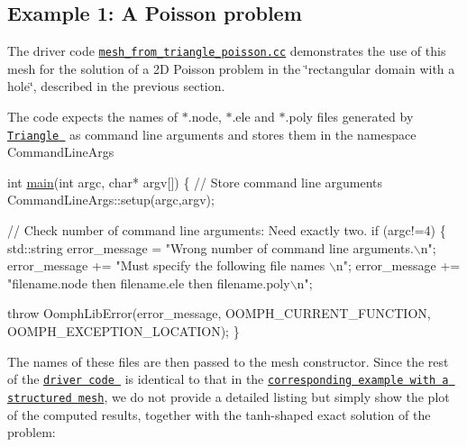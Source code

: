  

\hypertarget{index_poisson}{}\subsection{Example 1\+: A Poisson problem}\label{index_poisson}
The driver code \href{../../../../demo_drivers/meshing/mesh_from_triangle/mesh_from_triangle_poisson.cc}{\tt mesh\+\_\+from\+\_\+triangle\+\_\+poisson.\+cc} demonstrates the use of this mesh for the solution of a 2D Poisson problem in the \char`\"{}rectangular domain with a hole\char`\"{}, described in the previous section.

The code expects the names of {\ttfamily $\ast$}.{\ttfamily node}, $\ast$.{\ttfamily ele} and $\ast$.{\ttfamily poly} files generated by \href{http://www.cs.cmu.edu/~quake/triangle.html}{\tt {\ttfamily Triangle} } as command line arguments and stores them in the namespace {\ttfamily Command\+Line\+Args} 

 
\begin{DoxyCodeInclude}
\textcolor{keywordtype}{int} \hyperlink{mesh__from__triangle__navier__stokes_8cc_a0ddf1224851353fc92bfbff6f499fa97}{main}(\textcolor{keywordtype}{int} argc, \textcolor{keywordtype}{char}* argv[])
\{
 \textcolor{comment}{// Store command line arguments}
 CommandLineArgs::setup(argc,argv);

 \textcolor{comment}{// Check number of command line arguments: Need exactly two.}
 \textcolor{keywordflow}{if} (argc!=4)
  \{
   std::string error\_message =
    \textcolor{stringliteral}{"Wrong number of command line arguments.\(\backslash\)n"};
   error\_message +=
    \textcolor{stringliteral}{"Must specify the following file names  \(\backslash\)n"};
   error\_message += 
    \textcolor{stringliteral}{"filename.node then filename.ele then filename.poly\(\backslash\)n"};

   \textcolor{keywordflow}{throw} OomphLibError(error\_message,
                       OOMPH\_CURRENT\_FUNCTION,
                       OOMPH\_EXCEPTION\_LOCATION);
  \}

\end{DoxyCodeInclude}


The names of these files are then passed to the mesh constructor. Since the rest of the \href{../../../../demo_drivers/meshing/mesh_from_triangle/mesh_from_triangle_poisson.cc}{\tt driver code } is identical to that in the \href{../../../../doc/poisson/two_d_poisson/html/index.html}{\tt corresponding example with a structured mesh}, we do not provide a detailed listing but simply show the plot of the computed results, together with the tanh-\/shaped exact solution of the problem\+:

